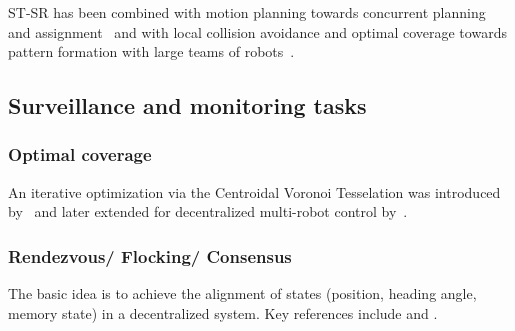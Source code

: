 ST-SR has been combined with motion planning towards concurrent planning and assignment~\cite{Turpin:2014bu} and with local collision avoidance and optimal coverage towards pattern formation with large teams of robots~\cite{alonsomora12ijrr}.


\subsection{Surveillance and monitoring tasks}

\subsubsection{Optimal coverage}
An iterative optimization via the Centroidal Voronoi Tesselation was introduced by~\cite{cortes04} and later extended for decentralized multi-robot control by~\cite{Schwager:2009fz}.

\subsubsection{Rendezvous/ Flocking/ Consensus} The basic idea is to achieve the alignment of states (position, heading angle, memory state) in a decentralized system. Key references include \cite{Cortes.Martinez.ea:06} and \cite{Jadbabaie.Lin.ea:03}.

